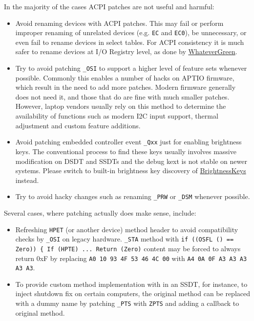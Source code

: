 \documentclass[]{article}
\begin{document}
In the majority of the cases ACPI patches are not useful and harmful:

\begin{itemize}
\item
  Avoid renaming devices with ACPI patches. This may fail or perform
  improper renaming of unrelated devices (e.g. \texttt{EC} and
  \texttt{EC0}), be unnecessary, or even fail to rename devices in select tables. For
  ACPI consistency it is much safer to rename devices at I/O Registry
  level, as done by
  \href{https://github.com/acidanthera/WhateverGreen}{WhateverGreen}.
\item
  Try to avoid patching \texttt{\_OSI} to support a higher level of feature sets
  whenever possible. Commonly this enables a number of hacks on APTIO
  firmware, which result in the need to add more patches. Modern firmware
  generally does not need it, and those that do are fine with much
  smaller patches. However, laptop vendors usually rely on this method to
  determine the availability of functions such as modern I2C input support, thermal
  adjustment and custom feature additions.
\item
  Avoid patching embedded controller event \texttt{\_Qxx} just for enabling
  brightness keys. The conventional process to find these keys usually involves
  massive modification on DSDT and SSDTs and the debug kext is not stable on
  newer systems. Please switch to built-in brightness key discovery of
  \href{https://github.com/acidanthera/BrightnessKeys}{BrightnessKeys} instead.
\item
  Try to avoid hacky changes such as renaming \texttt{\_PRW} or \texttt{\_DSM}
  whenever possible.
\end{itemize}

Several cases, where patching actually does make sense, include:

\begin{itemize}
\item
  Refreshing \texttt{HPET} (or another device) method header to avoid
  compatibility checks by \texttt{\_OSI} on legacy hardware. \texttt{\_STA}
  method with \texttt{if ((OSFL () == Zero)) \{ If (HPTE)  ...  Return (Zero)}
  content may be forced to always return 0xF by replacing
  \texttt{A0 10 93 4F 53 46 4C 00} with \texttt{A4 0A 0F A3 A3 A3 A3 A3}.
\item
  To provide custom method implementation with in an SSDT, for instance,
  to inject shutdown fix on certain computers, the original method can be
  replaced with a dummy name by patching \texttt{\_PTS} with \texttt{ZPTS}
  and adding a callback to original method.
\end{itemize}
\end{document}
